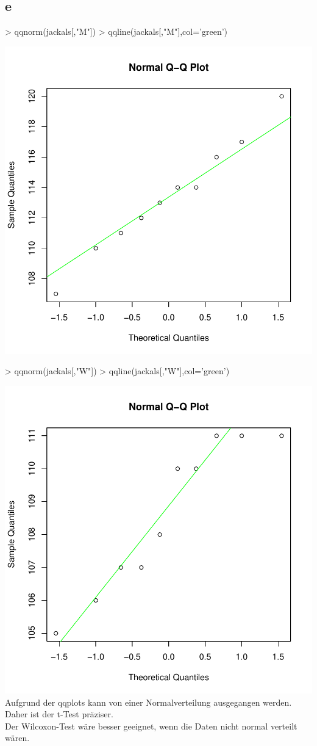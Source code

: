 \subsection{e}
\begin{Schunk}
\begin{Sinput}
> qqnorm(jackals[,"M"])
> qqline(jackals[,"M"],col='green')
\end{Sinput}
\end{Schunk}
\includegraphics{sw11_2-003}
\begin{Schunk}
\begin{Sinput}
> qqnorm(jackals[,"W"])
> qqline(jackals[,"W"],col='green')
\end{Sinput}
\end{Schunk}
\includegraphics{sw11_2-004}
Aufgrund der qqplots kann von einer Normalverteilung ausgegangen werden. 
Daher ist der t-Test präziser. \\
Der Wilcoxon-Test wäre besser geeignet, wenn die Daten nicht normal verteilt 
wären. 
